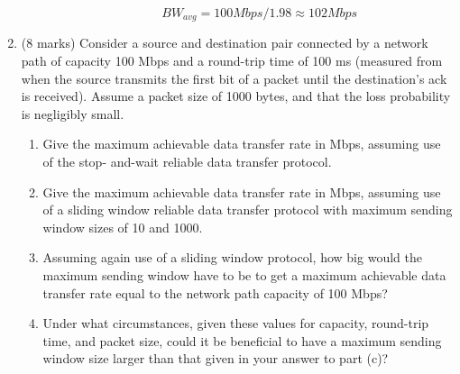 \documentclass[10pt]{amsart}
\begin{document}
\begin{enumerate}
\begin{enumerate}
\begin{enumerate}
                \[ BW_{avg} = 100 Mbps / 1.98 \approx 102 Mbps \]
        \end{enumerate}
    \end{enumerate}
    \item (8 marks) Consider a source and destination pair connected by a network
        path of capacity 100 Mbps and a round-trip time of 100 ms (measured from
        when the source transmits the first bit of a packet until the destination’s
        ack is received). Assume a packet size of 1000 bytes, and that the loss
        probability is negligibly small.
    \begin{enumerate}
        \item Give the maximum achievable data transfer rate in Mbps, assuming
            use of the stop- and-wait reliable data transfer protocol.
        \item Give the maximum achievable data transfer rate in Mbps, assuming
            use of a sliding window reliable data transfer protocol with maximum
            sending window sizes of 10 and 1000.
        \item Assuming again use of a sliding window protocol, how big would the
            maximum sending window have to be to get a maximum achievable data
            transfer rate equal to the network path capacity of 100 Mbps?
        \item Under what circumstances, given these values for capacity,
            round-trip time, and packet size, could it be beneficial to have a
            maximum sending window size larger than that given in your answer to
            part (c)?
    \end{enumerate}
\end{enumerate}
\end{document}

